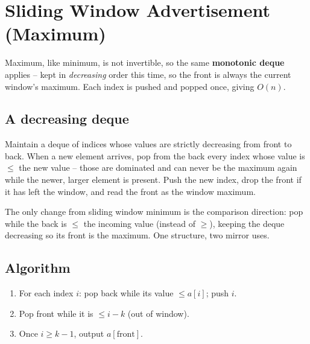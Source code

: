 \section{Sliding Window Advertisement (Maximum)}
\label{sec:cses-sw-advertisement}


\begin{patternbox}
Maximum, like minimum, is not invertible, so the same \textbf{monotonic
deque} applies -- kept in \emph{decreasing} order this time, so the front is
always the current window's maximum. Each index is pushed and popped once,
giving $O(n)$.
\end{patternbox}

\subsection*{A decreasing deque}

Maintain a deque of indices whose values are strictly decreasing from front
to back. When a new element arrives, pop from the back every index whose
value is $\le$ the new value -- those are dominated and can never be the
maximum again while the newer, larger element is present. Push the new
index, drop the front if it has left the window, and read the front as the
window maximum.

\begin{ideabox}
The only change from sliding window minimum is the comparison direction:
pop while the back is $\le$ the incoming value (instead of $\ge$), keeping
the deque decreasing so its front is the maximum. One structure, two mirror
uses.
\end{ideabox}

\subsection*{Algorithm}

\begin{enumerate}
  \item For each index $i$: pop back while its value $\le a[i]$; push $i$.
  \item Pop front while it is $\le i-k$ (out of window).
  \item Once $i\ge k-1$, output $a[\text{front}]$.
\end{enumerate}

